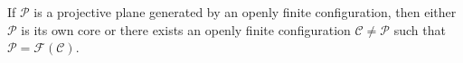If $\mathcal{P}$ is a projective plane generated by an openly finite configuration, then either $\mathcal{P}$ is its own core or there exists an openly finite configuration $\mathcal{C} \neq \mathcal{P}$ such that $\mathcal{P} = \mathcal{F}(\mathcal{C})$.

